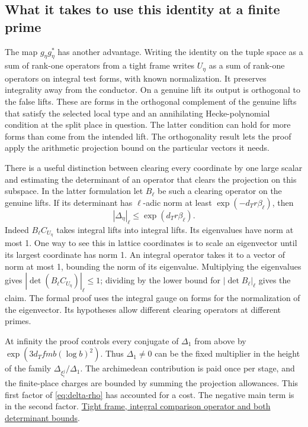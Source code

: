 \documentclass[11pt,letterpaper]{article}
\newcommand{\sref}[2]{\href{https://github.com/VladimirReshetnikov/ProveIt/blob/d8415e76ad850651f8c0083afe689dd9f4a45a10/Analysis/GeneralizedRiemannHypothesis/vendor/grh-lean/grh/src/#1.lean}{#2}}
\begin{document}
\subsection{What it takes to use this identity at a finite prime}

The map \(g_\eta g_\eta^*\) has another advantage. Writing the identity on the tuple space as a sum of rank-one operators from a tight frame writes \(U_\eta\) as a sum of rank-one operators on integral test forms, with known normalization. It preserves integrality away from the conductor. On a genuine lift its output is orthogonal to the false lifts. These are forms in the orthogonal complement of the genuine lifts that satisfy the selected local type and an annihilating Hecke-polynomial condition at the split place in question. The latter condition can hold for more forms than come from the intended lift. The orthogonality result lets the proof apply the arithmetic projection bound on the particular vectors it needs.

There is a useful distinction between clearing every coordinate by one large scalar and estimating the determinant of an operator that clears the projection on this subspace. In the latter formulation let \(B_\ell\) be such a clearing operator on the genuine lifts. If its determinant has \(\ell\)-adic norm at least \(\exp(-d_T r\beta_\ell)\), then
\[
              |\Delta_\eta|_\ell\le \exp(d_T r\beta_\ell).
\]
Indeed \(B_\ell C_{U_\eta}\) takes integral lifts into integral lifts. Its eigenvalues have norm at most 1. One way to see this in lattice coordinates is to scale an eigenvector until its largest coordinate has norm 1. An integral operator takes it to a vector of norm at most 1, bounding the norm of its eigenvalue. Multiplying the eigenvalues gives \(|\det(B_\ell C_{U_\eta})|_\ell\le1\); dividing by the lower bound for \(|\det B_\ell|_\ell\) gives the claim. The formal proof uses the integral gauge on forms for the normalization of the eigenvector. Its hypotheses allow different clearing operators at different primes.

At infinity the proof controls every conjugate of \(\Delta_1\) from above by \(\exp(3d_T f m b(\log b)^2)\). Thus \(\Delta_1\ne0\) can be the fixed multiplier in the height of the family \(\Delta_{\xi_\iota^j}/\Delta_1\). The archimedean contribution is paid once per stage, and the finite-place charges are bounded by summing the projection allowances. This first factor of \eqref{eq:delta-rho} has accounted for a cost. The negative main term is in the second factor. \sref{New/OneLift/LiftVolumeHeight}{Tight frame, integral comparison operator and both determinant bounds}.
\end{document}
